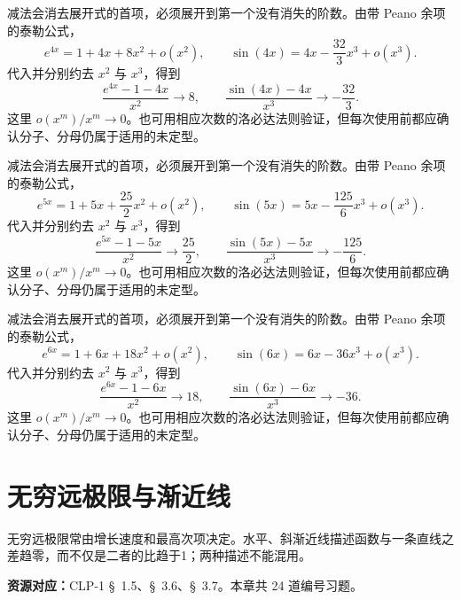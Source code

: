 \documentclass[UTF8,12pt,a4paper,fontset=fandol]{ctexart}
\begin{document}
\begin{solve}\label{ans:c3q23}
减法会消去展开式的首项，必须展开到第一个没有消失的阶数。由带 Peano 余项的泰勒公式，
\[
e^{4x}=1+4x+8x^2+o(x^2),\qquad\sin(4x)=4x-\frac{32}{3}x^3+o(x^3).
\]
代入并分别约去 $x^2$ 与 $x^3$，得到
\[
\frac{e^{4x}-1-4x}{x^2}\to 8,\qquad\frac{\sin(4x)-4x}{x^3}\to-\frac{32}{3}.
\]
这里 $o(x^m)/x^m\to0$。也可用相应次数的洛必达法则验证，但每次使用前都应确认分子、分母仍属于适用的未定型。
\end{solve}

\begin{solve}\label{ans:c3q24}
减法会消去展开式的首项，必须展开到第一个没有消失的阶数。由带 Peano 余项的泰勒公式，
\[
e^{5x}=1+5x+\frac{25}{2}x^2+o(x^2),\qquad\sin(5x)=5x-\frac{125}{6}x^3+o(x^3).
\]
代入并分别约去 $x^2$ 与 $x^3$，得到
\[
\frac{e^{5x}-1-5x}{x^2}\to \frac{25}{2},\qquad\frac{\sin(5x)-5x}{x^3}\to-\frac{125}{6}.
\]
这里 $o(x^m)/x^m\to0$。也可用相应次数的洛必达法则验证，但每次使用前都应确认分子、分母仍属于适用的未定型。
\end{solve}

\begin{solve}\label{ans:c3q25}
减法会消去展开式的首项，必须展开到第一个没有消失的阶数。由带 Peano 余项的泰勒公式，
\[
e^{6x}=1+6x+18x^2+o(x^2),\qquad\sin(6x)=6x-36x^3+o(x^3).
\]
代入并分别约去 $x^2$ 与 $x^3$，得到
\[
\frac{e^{6x}-1-6x}{x^2}\to 18,\qquad\frac{\sin(6x)-6x}{x^3}\to-36.
\]
这里 $o(x^m)/x^m\to0$。也可用相应次数的洛必达法则验证，但每次使用前都应确认分子、分母仍属于适用的未定型。
\end{solve}

\clearpage
\section{无穷远极限与渐近线}\label{sec:ch4}
无穷远极限常由增长速度和最高次项决定。水平、斜渐近线描述函数与一条直线之差趋零，而不仅是二者的比趋于1；两种描述不能混用。

\textbf{资源对应：}CLP-1 \S~1.5、\S~3.6、\S~3.7。本章共 24 道编号习题。
\end{document}
